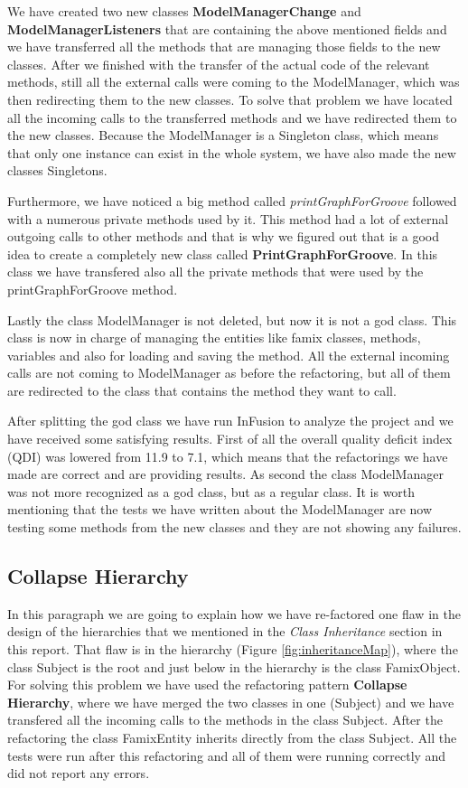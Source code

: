\documentclass[a4paper]{article}
\begin{document}
We have created two new classes \textbf{ModelManagerChange} and \textbf{ModelManagerListeners} that are containing the above mentioned fields and we have transferred all the methods that are managing those fields to the new classes. After we finished with the transfer of the actual code of the relevant methods, still all the external calls were coming to the ModelManager, which was then redirecting them to the new classes. To solve that problem we have located all the incoming calls to the transferred methods and we have redirected them to the new classes. Because the ModelManager is a Singleton class, which means that only one instance can exist in the whole system, we have also made the new classes Singletons.

Furthermore, we have noticed a big method called \emph{printGraphForGroove} followed with a numerous private methods used by it. This method had a lot of external outgoing calls to other methods and that is why we figured out that is a good idea to create a completely new class called \textbf{PrintGraphForGroove}. In this class we have transfered also all the private methods that were used by the printGraphForGroove method.

Lastly the class ModelManager is not deleted, but now it is not a god class. This class is now in charge of managing the entities like famix classes, methods, variables and also for loading and saving the method. All the external incoming calls are not coming to ModelManager as before the refactoring, but all of them are redirected to the class that contains the method they want to call.

After splitting the god class we have run InFusion to analyze the project and we have received some satisfying results. First of all the overall quality deficit index (QDI) was lowered from 11.9 to 7.1, which means that the refactorings we have made are correct and are providing results. As second the class ModelManager was not more recognized as a god class, but as a regular class. It is worth mentioning that the tests we have written about the ModelManager are now testing some methods from the new classes and they are not showing any failures.

\subsection{Collapse Hierarchy \cite{sourcemaking}}
In this paragraph we are going to explain how we have re-factored one flaw in the design of the hierarchies that we mentioned in the \emph{Class Inheritance} section in this report. That flaw is in the hierarchy (Figure \ref{fig:inheritanceMap}), where the class Subject is the root and just below in the hierarchy is the class FamixObject. For solving this problem we have used the refactoring pattern \textbf{Collapse Hierarchy}, where we have merged the two classes in one (Subject) and we have transfered all the incoming calls to the methods in the class Subject. After the refactoring the class FamixEntity inherits directly from the class Subject. All the tests were run after this refactoring and all of them were running correctly and did not report any errors.
\end{document}
